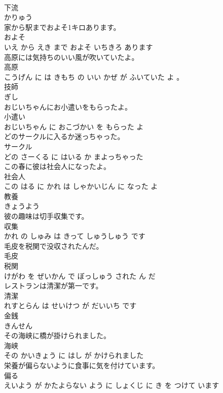 \documentclass[8pt]{extreport}
\begin{document}
\begin{CJK}{UTF8}{min}
\\	下流	
\\	かりゅう			
\\	家から駅までおよそ1キロあります。	
\\	およそ 
\\	いえ から えき まで およそ いちきろ あります			
\\	高原には気持ちのいい風が吹いていたよ。	
\\	高原 
\\	こうげん に は きもち の いい かぜ が ふいていた よ 。			
\\	技師	
\\	ぎし			
\\	おじいちゃんにお小遣いをもらったよ。	
\\	小遣い 
\\	おじいちゃん に おこづかい を もらった よ			
\\	どのサークルに入るか迷っちゃった。	
\\	サークル 
\\	どの さーくる に はいる か まよっちゃった			
\\	この春に彼は社会人になったよ。	
\\	社会人 
\\	この はる に かれ は しゃかいじん に なった よ			
\\	教養	
\\	きょうよう			
\\	彼の趣味は切手収集です。	
\\	収集 
\\	かれ の しゅみ は きって しゅうしゅう です			
\\	毛皮を税関で没収されたんだ。	
\\	毛皮 
\\	税関 
\\	けがわ を ぜいかん で ぼっしゅう された ん だ			
\\	レストランは清潔が第一です。	
\\	清潔 
\\	れすとらん は せいけつ が だいいち です			
\\	金銭	
\\	きんせん			
\\	その海峡に橋が掛けられました。	
\\	海峡 
\\	その かいきょう に はし が かけられました			
\\	栄養が偏らないように食事に気を付けています。	
\\	偏る 
\\	えいよう が かたよらない よう に しょくじ に き を つけて います			

\end{CJK}
\end{document}
